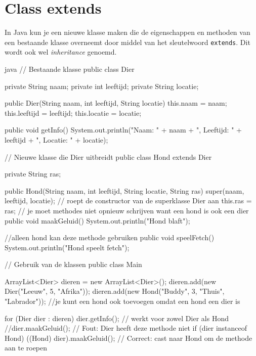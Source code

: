 \documentclass[a4paper,11pt]{article}
\begin{document}
\section{Class extends}
In Java kun je een nieuwe klasse maken die de eigenschappen en methoden van een bestaande klasse overneemt door middel van het sleutelwoord \texttt{extends}. Dit wordt ook wel \textit{inheritance} genoemd.

\begin{codeblock}{java}
    // Bestaande klasse
    public class Dier 
    {

    private String naam;
    private int leeftijd;
    private String locatie;

    public Dier(String naam, int leeftijd, String locatie) {
        this.naam = naam;
        this.leeftijd = leeftijd;
        this.locatie = locatie;
        }

        public void getInfo() {
            System.out.println("Naam: " + naam + ", Leeftijd: " + leeftijd + ", Locatie: " + locatie);
        }
    }

    // Nieuwe klasse die Dier uitbreidt
    public class Hond extends Dier 
    {

        private String ras;

        public Hond(String naam, int leeftijd, String locatie, String ras) {
            super(naam, leeftijd, locatie); // roept de constructor van de superklasse Dier aan
            this.ras = ras;
        }
        // je moet methodes niet opnieuw schrijven want een hond is ook een dier
        public void maakGeluid() {
            System.out.println("Hond blaft");
        }

        //alleen hond kan deze methode gebruiken
        public void speelFetch() {
            System.out.println("Hond speelt fetch");
        }
    }

    // Gebruik van de klassen
    public class Main 
    {
        ArrayList<Dier> dieren = new ArrayList<Dier>();
        dieren.add(new Dier("Leeuw", 5, "Afrika"));
        dieren.add(new Hond("Buddy", 3, "Thuis", "Labrador"));
        //je kunt een hond ook toevoegen omdat een hond een dier is

        for (Dier dier : dieren) {
            dier.getInfo(); // werkt voor zowel Dier als Hond
            //dier.maakGeluid(); // Fout: Dier heeft deze methode niet
            if (dier instanceof Hond) {
                ((Hond) dier).maakGeluid(); // Correct: cast naar Hond om de methode aan te roepen
            }
        }
    }
\end{codeblock}
\end{document}
